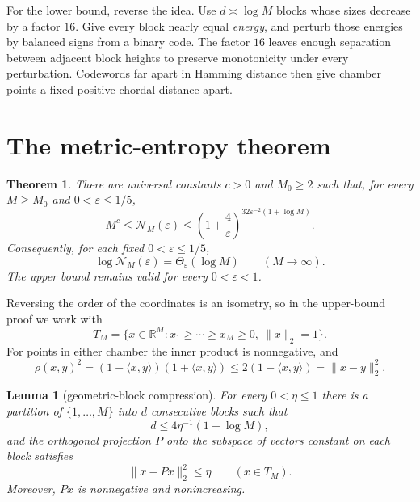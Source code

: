 \documentclass[11pt]{article}
\newtheorem{theorem}{Theorem}
\newtheorem{lemma}{Lemma}
\newcommand{\R}{\mathbb R}
\newcommand{\cN}{\mathcal N}
\begin{document}
For the lower bound, reverse the idea.  Use $d\asymp\log M$ blocks whose sizes
decrease by a factor $16$.  Give every block nearly equal \emph{energy}, and
perturb those energies by balanced signs from a binary code.  The factor $16$
leaves enough separation between adjacent block heights to preserve
monotonicity under every perturbation.  Codewords far apart in Hamming distance
then give chamber points a fixed positive chordal distance apart.

\section{The metric-entropy theorem}

\begin{theorem}\label{thm:main}
There are universal constants $c>0$ and $M_0\geq2$ such that, for every
$M\geq M_0$ and $0<\varepsilon\leq1/5$,
\begin{equation}\label{eq:main}
 M^c\leq \cN_M(\varepsilon)
 \leq
 \left(1+\frac4\varepsilon\right)^{
 32\varepsilon^{-2}(1+\log M)}.
\end{equation}
Consequently, for each fixed $0<\varepsilon\leq1/5$,
\[
 \log \cN_M(\varepsilon)=\Theta_\varepsilon(\log M)
 \qquad(M\to\infty).
\]
The upper bound remains valid for every $0<\varepsilon<1$.
\end{theorem}

Reversing the order of the coordinates is an isometry, so in the upper-bound
proof we work with
\[
 T_M=\{x\in\R^M:x_1\geq\cdots\geq x_M\geq0,\ \|x\|_2=1\}.
\]
For points in either chamber the inner product is nonnegative, and
\begin{equation}\label{eq:metriccomparison}
 \rho(x,y)^2=(1-\langle x,y\rangle)(1+\langle x,y\rangle)
 \leq 2(1-\langle x,y\rangle)=\|x-y\|_2^2.
\end{equation}

\begin{lemma}[geometric-block compression]\label{lem:compression}
For every $0<\eta\leq1$ there is a partition of
$\{1,\ldots,M\}$ into $d$ consecutive blocks such that
\begin{equation}\label{eq:dimbound}
 d\leq4\eta^{-1}(1+\log M),
\end{equation}
and the orthogonal projection $P$ onto the subspace of vectors constant on
each block satisfies
\begin{equation}\label{eq:projectionerror}
 \|x-Px\|_2^2\leq\eta\qquad(x\in T_M).
\end{equation}
Moreover, $Px$ is nonnegative and nonincreasing.
\end{lemma}
\end{document}
